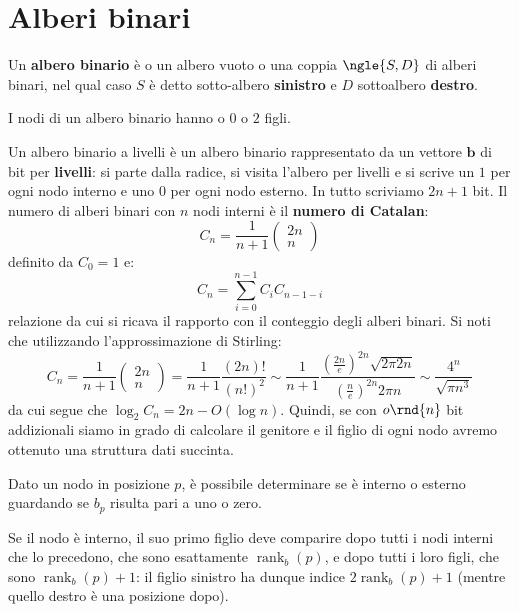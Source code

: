 \documentclass[\main/main.tex]{subfiles}
\begin{document}
\section{Alberi binari}
\begin{definition}
    Un \textbf{albero binario} è o un albero vuoto o una coppia \(\ngle{S, D}\) di alberi binari, nel qual caso \(S\) è detto sotto-albero \textbf{sinistro} e \(D\) sottoalbero \textbf{destro}.
    
    I nodi di un albero binario hanno o \(0\) o \(2\) figli.
\end{definition}
\begin{definition}
    Un albero binario a livelli è un albero binario rappresentato da un vettore \(\bm{b}\) di bit per \textbf{livelli}: si parte dalla radice, si visita l'albero per livelli e si scrive un \(1\) per ogni nodo interno e uno \(0\) per ogni nodo esterno. In tutto scriviamo \(2n +1\) bit. Il numero di alberi binari con \(n\) nodi interni è il \textbf{numero di Catalan}:
    \[
        C_{n}=\frac{1}{n+1}\left(\begin{array}{l}{2 n} \\ {n}\end{array}\right)
    \]
    definito da \(C_0 = 1\) e:
    \[
        C_{n}=\sum_{i=0}^{n-1} C_{i} C_{n-1-i}
    \]
    relazione da cui si ricava il rapporto con il conteggio degli alberi binari. Si noti che utilizzando l'approssimazione di Stirling:
    \[
        C_{n}=\frac{1}{n+1}\left(\begin{array}{l}{2 n} \\ {n}\end{array}\right)=\frac{1}{n+1} \frac{(2 n) !}{(n !)^{2}} \sim \frac{1}{n+1} \frac{\left(\frac{2 n}{e}\right)^{2 n} \sqrt{2 \pi 2 n}}{\left(\frac{n}{e}\right)^{2 n} 2 \pi n} \sim \frac{4^{n}}{\sqrt{\pi n^{3}}}
    \]
    da cui segue che \(\log_2 C_{n}=2 n-O(\log n)\). Quindi, se con \(o\rnd{n}\) bit addizionali siamo in grado di calcolare il genitore e il figlio di ogni nodo avremo ottenuto una struttura dati succinta.
    
    Dato un nodo in posizione \(p\), è possibile determinare se è interno o esterno guardando se \(b_p\) risulta pari a uno o zero.
    
    Se il nodo è interno, il suo primo figlio deve comparire dopo tutti i nodi interni che lo precedono, che sono esattamente \(\operatorname{rank}_{b}(p)\), e dopo tutti i loro figli, che sono \(\operatorname{rank}_{b}(p)+1\): il figlio sinistro ha dunque indice \(2 \operatorname{rank}_{b}(p)+1\) (mentre quello destro è una posizione dopo).
    

\end{definition}
\end{document}
